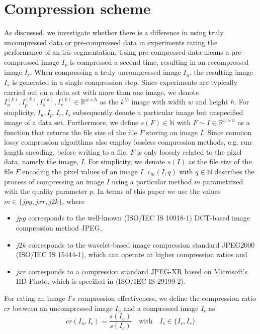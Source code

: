 \documentclass[10pt,twocolumn,letterpaper]{article}
\begin{document}
\section{Compression scheme}
\label{section:comprScheme}
As discussed, we investigate whether there is a difference in using truly uncompressed data or pre-compressed data in experiments rating the performance of an iris segmentation. 
Using pre-compressed data means a pre-compressed image $I_p$ is compressed a second time, resulting in an recompressed image $I_r$. When compressing a truly uncompressed image $I_u$, the resulting image $I_s$ is generated in a single compression step. Since experiments are typically carried out on a data set with more than one image, we denote $I_u^{(k)}, I_p^{(k)}, I_s^{(k)}, I_r^{(k)} \in \mathbb{R}^{w \times h}$ as the $k^{th}$ image with width $w$ and height $h$. For simplicity, $I_u, I_p, I_r, I_s$ subsequently denote a particular image but unspecified image of a data set. Furthermore, we define $s(F) \in \mathbb{N}$ with $F \sim{I \in \mathbb{R}^{w \times h}}$ as a function that returns the file size of the file $F$ storing an image $I$. Since common lossy compression algorithms also employ lossless compression methods, e.g. run-length encoding, before writing to a file, $F$ is only loosely related to the pixel data, namely the image, $I$. For simplicity, we denote $s(I)$ as the file size of the file $F$ encoding the pixel values of an image $I$. $c_{m}(I, q)$ with $q \in \mathbb{N}$ describes the process of compressing an image $I$ using a particular method $m$ parametrized with the quality parameter $p$. In terms of this paper we use the values $m \in \{jpg, jxr, j2k\}$, where 
\begin{itemize}
	\item $jpg$ corresponds to the well-known (ISO/IEC IS 10918-1) DCT-based image compression method JPEG, %
	\item $j2k$ corresponds to the wavelet-based image compression standard JPEG2000 (ISO/IEC IS 15444-1), which can operate at higher compression ratios %
	and
	\item $jxr$ corresponds to a compression standard JPEG-XR based on Microsoft’s HD Photo, which is specified in (ISO/IEC IS 29199-2). %
\end{itemize}

For rating an image $I$'s compression effectiveness, we define the compression ratio $cr$ between an uncompressed image $I_u$ and a compressed image $I_c$ as 
\begin{equation}
cr(I_u, I_c) = \frac{s(I_u)}{s(I_c)} \quad \text{with} \quad I_c \in \{I_r, I_s\}
\end{equation}
\end{document}
